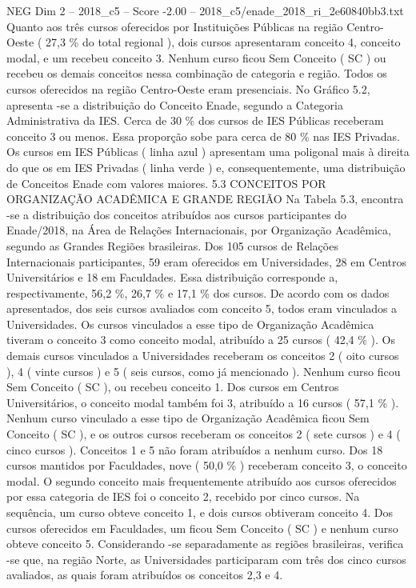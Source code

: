 \begin{textsample}{NEG Dim 2 – 2018\_c5 – Score -2.00 – 2018\_c5/enade\_2018\_ri\_2e60840bb3.txt}
Quanto aos três cursos oferecidos por Instituições Públicas na região Centro-Oeste ( 27,3 \% do total regional ), dois cursos apresentaram conceito 4, conceito modal, e um recebeu conceito 3.
Nenhum curso ficou Sem Conceito ( SC ) ou recebeu os demais conceitos nessa combinação de categoria e região.
Todos os cursos oferecidos na região Centro-Oeste eram presenciais.
No Gráfico 5.2, apresenta -se a distribuição do Conceito Enade, segundo a Categoria Administrativa da IES.
Cerca de 30 \% dos cursos de IES Públicas receberam conceito 3 ou menos.
Essa proporção sobe para cerca de 80 \% nas IES Privadas.
Os cursos em IES Públicas ( linha azul ) apresentam uma poligonal mais à direita do que os em IES Privadas ( linha verde ) e, consequentemente, uma distribuição de Conceitos Enade com valores maiores. 5.3 CONCEITOS POR ORGANIZAÇÃO ACADÊMICA E GRANDE REGIÃO Na Tabela 5.3, encontra -se a distribuição dos conceitos atribuídos aos cursos participantes do Enade/2018, na Área de Relações Internacionais, por Organização Acadêmica, segundo as Grandes Regiões brasileiras.
Dos 105 cursos de Relações Internacionais participantes, 59 eram oferecidos em Universidades, 28 em Centros Universitários e 18 em Faculdades.
Essa distribuição corresponde a, respectivamente, 56,2 \%, 26,7 \% e 17,1 \% dos cursos.
De acordo com os dados apresentados, dos seis cursos avaliados com conceito 5, todos eram vinculados a Universidades.
Os cursos vinculados a esse tipo de Organização Acadêmica tiveram o conceito 3 como conceito modal, atribuído a 25 cursos ( 42,4 \% ).
Os demais cursos vinculados a Universidades receberam os conceitos 2 ( oito cursos ), 4 ( vinte cursos ) e 5 ( seis cursos, como já mencionado ).
Nenhum curso ficou Sem Conceito ( SC ), ou recebeu conceito 1.
Dos cursos em Centros Universitários, o conceito modal também foi 3, atribuído a 16 cursos ( 57,1 \% ).
Nenhum curso vinculado a esse tipo de Organização Acadêmica ficou Sem Conceito ( SC ), e os outros cursos receberam os conceitos 2 ( sete cursos ) e 4 ( cinco cursos ).
Conceitos 1 e 5 não foram atribuídos a nenhum curso.
Dos 18 cursos mantidos por Faculdades, nove ( 50,0 \% ) receberam conceito 3, o conceito modal.
O segundo conceito mais frequentemente atribuído aos cursos oferecidos por essa categoria de IES foi o conceito 2, recebido por cinco cursos.
Na sequência, um curso obteve conceito 1, e dois cursos obtiveram conceito 4.
Dos cursos oferecidos em Faculdades, um ficou Sem Conceito ( SC ) e nenhum curso obteve conceito 5.
Considerando -se separadamente as regiões brasileiras, verifica -se que, na região Norte, as Universidades participaram com três dos cinco cursos avaliados, as quais foram atribuídos os conceitos 2,3 e 4.

\end{textsample}
